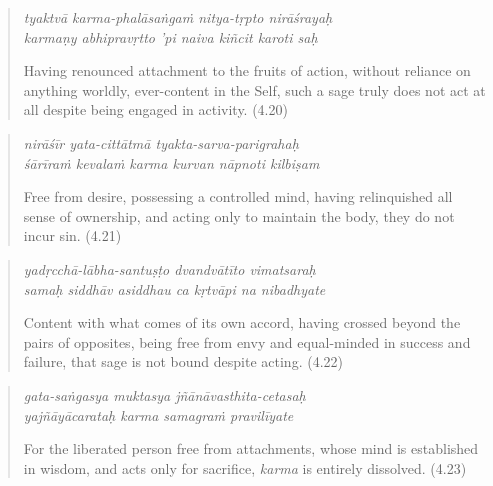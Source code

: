 \documentclass[12pt, twoside, openright]{memoir}
\begin{document}
\par
\begin{verse}
\textit{tyaktvā karma-phalāsaṅgaṁ nitya-tṛpto nirāśrayaḥ} \\
\textit{karmaṇy abhipravṛtto ’pi naiva kiñcit karoti saḥ}

\noindent Having renounced attachment to the fruits of action, without reliance on anything worldly, ever-content in the Self, such a sage truly does not act at all despite being engaged in activity. (4.20)
\end{verse}
\par



\par
\begin{verse}
\textit{nirāśīr yata-cittātmā tyakta-sarva-parigrahaḥ} \\
\textit{śārīraṁ kevalaṁ karma kurvan nāpnoti kilbiṣam}

\noindent Free from desire, possessing a controlled mind, having relinquished all sense of ownership, and acting only to maintain the body, they do not incur sin. (4.21)
\end{verse}
\par



\par
\begin{verse}
\textit{yadṛcchā-lābha-santuṣṭo dvandvātīto vimatsaraḥ} \\
\textit{samaḥ siddhāv asiddhau ca kṛtvāpi na nibadhyate}

\noindent Content with what comes of its own accord, having crossed beyond the pairs of opposites, being free from envy and equal-minded in success and failure, that sage is not bound despite acting. (4.22)
\end{verse}
\par



\par
\begin{verse}
\textit{gata-saṅgasya muktasya jñānāvasthita-cetasaḥ} \\
\textit{yajñāyācarataḥ karma samagraṁ pravilīyate}

\noindent For the liberated person free from attachments, whose mind is established in wisdom, and acts only for sacrifice, \textit{karma} is entirely dissolved. (4.23)
\end{verse}
\par
\end{document}
